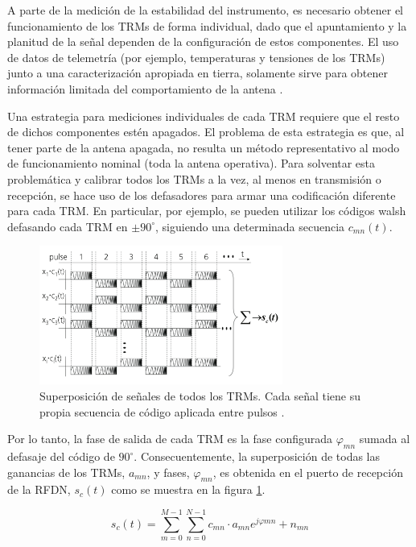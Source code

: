 A parte de la medición de la estabilidad del instrumento, es necesario obtener el funcionamiento de los TRMs de forma
individual, dado que el apuntamiento y la planitud de la señal dependen de la configuración de estos componentes. El uso de 
datos de telemetría (por ejemplo, temperaturas y tensiones de los TRMs) junto a una caracterización apropiada en tierra, 
solamente sirve para obtener información limitada del comportamiento de la antena \cite{Br2007}.

Una estrategia para mediciones individuales de cada TRM requiere que el resto de dichos componentes estén apagados. El problema
de esta estrategia es que, al tener parte de la antena apagada, no resulta un método representativo al modo de funcionamiento 
nominal (toda la antena operativa). Para solventar esta problemática y calibrar todos los TRMs a la vez, al menos en 
transmisión o recepción, se hace uso de los defasadores para armar una codificación diferente para cada TRM. En particular, 
por ejemplo, se pueden utilizar los códigos walsh \cite{WalshCode} defasando cada TRM en $\pm90^{\circ}$, siguiendo una 
determinada secuencia $c_{mn}(t)$.

\begin{figure}
 \centering
 \includegraphics[width=8cm]{gfx/superposition_signals_classic.png}
 \caption{Superposición de señales de todos los TRMs. Cada señal tiene su propia secuencia de código aplicada entre pulsos \cite{Br2007}.}
 \label{fig:sup_sign_classic}
\end{figure}

Por lo tanto, la fase de salida de cada TRM es la fase configurada $\varphi_{mn}$ sumada al defasaje del código de
$90^{\circ}$. Consecuentemente, la superposición de todas las ganancias de los TRMs, $a_{mn}$, y fases, $\varphi_{mn}$,
es obtenida en el puerto de recepción de la RFDN, $s_c(t)$ como se muestra en la figura \ref{fig:sup_sign_classic}.

\begin{equation}
	s_c(t) = \sum_{m=0}^{M-1}\sum_{n=0}^{N-1}c_{mn}\cdot a_{mn}e^{j\varphi{mn}} + n_{mn}
\end{equation}

